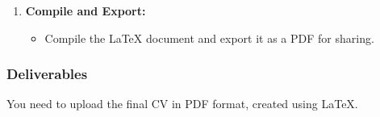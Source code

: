 \documentclass[a4paper,12pt]{report}
\begin{document}
\begin{enumerate}[label=\arabic*.]
    \item \textbf{Compile and Export:}
    \begin{itemize}
        \item Compile the LaTeX document and export it as a PDF for sharing.
    \end{itemize}
\end{enumerate}

\subsubsection*{Deliverables}
You need to upload the final CV in PDF format, created using LaTeX.
\end{document}
